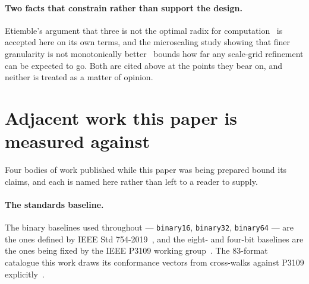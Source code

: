\paragraph{Two facts that constrain rather than support the design.} Etiemble's
argument that three is not the optimal radix for computation~\cite{etiemble2019} is
accepted here on its own terms, and the microscaling study showing that finer
granularity is not monotonically better~\cite{fasoli2026} bounds how far any
scale-grid refinement can be expected to go. Both are cited above at the points
they bear on, and neither is treated as a matter of opinion.


\section{Adjacent work this paper is measured against}\label{sec:adjacent}

Four bodies of work published while this paper was being prepared bound its
claims, and each is named here rather than left to a reader to supply.

\paragraph{The standards baseline.} The binary baselines used throughout ---
\texttt{binary16}, \texttt{binary32}, \texttt{binary64} --- are the ones defined
by IEEE Std 754-2019~\cite{ieee754_2019}, and the eight- and four-bit baselines
are the ones being fixed by the IEEE P3109 working
group~\cite{p3109wg2026}. The 83-format catalogue this work draws its
conformance vectors from cross-walks against P3109 explicitly~\cite{catalogue}.

